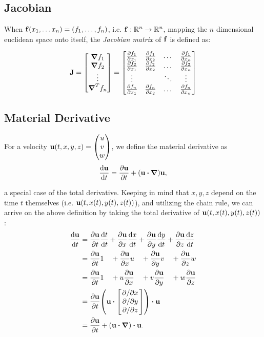 \subsection*{Jacobian}


When $\vb{f}(x_1,\dots x_n) = (f_1, \dots, f_n)$, i.e. $\vb{f}: \mathbb{R}^n \to
\mathbb{R}^n$, mapping the $n$ dimensional euclidean space onto itself, the
\textit{Jacobian matrix} of $\vb{f}$ is defined as:


$$\vb{J} = \mqty[\grad{f_1}\\\grad{f_2}\\\vdots\\\grad^T f_n] = 
\mqty[
\pdv{f_1}{x_1} & \pdv{f_1}{x_2} & \dots & \pdv{f_1}{x_n}\\
\pdv{f_2}{x_1} & \pdv{f_2}{x_2} & \dots & \pdv{f_2}{x_n}\\
\vdots         &                & \ddots & \vdots \\
\pdv{f_n}{x_1} & \pdv{f_n}{x_2} & \dots & \pdv{f_n}{x_n}
]$$


\subsection*{Material Derivative}
For a velocity $\vb{u}(t,x,y,z) = \mqty(u \\ v \\ w)$, 
we define the material derivative as 
$$\dv{\vb{u}}{t} = \pdv{\vb{u}}{t} + \qty(\vb{u}\vdot\grad)\vb{u} ,$$

a special case of the total derivative. Keeping in mind that $x, y, z$ depend on
the time $t$ themselves (i.e. $\vb{u}(t, x(t), y(t), z(t))$), and utilizing the
chain rule, we can arrive on the above definition by taking the total derivative
of $\vb{u}(t, x(t), y(t), z(t))$:
\begin{alignat*}{2}
    \dv{\vb{u}}{t} &= \pdv{\vb{u}}{t}\dv{t}{t} 
                    + \pdv{\vb{u}}{x}\dv{x}{t} 
                    + \pdv{\vb{u}}{y}\dv{y}{t} 
                    + \pdv{\vb{u}}{z}\dv{z}{t} \\
                    &= \pdv{\vb{u}}{t} 1 \quad
                    + \pdv{\vb{u}}{x} u \quad
                    + \pdv{\vb{u}}{y} v \quad
                    + \pdv{\vb{u}}{z} w \\
                    &= \pdv{\vb{u}}{t} 1 \quad
                    + u \pdv{\vb{u}}{x} \quad
                    + v \pdv{\vb{u}}{y} \quad
                    + w \pdv{\vb{u}}{z} \\
                    &= \pdv{\vb{u}}{t}
                    \qty(
                        \vb{u}
                        \vdot
                        \mqty[ \pdv*{x} \\ \pdv*{y} \\ \pdv*{z} ]
                    ) \vdot \vb{u} \\
                    &= \pdv{\vb{u}}{t}
                    + \qty(\vb{u}\vdot\grad)\vdot\vb{u}.
\end{alignat*}

